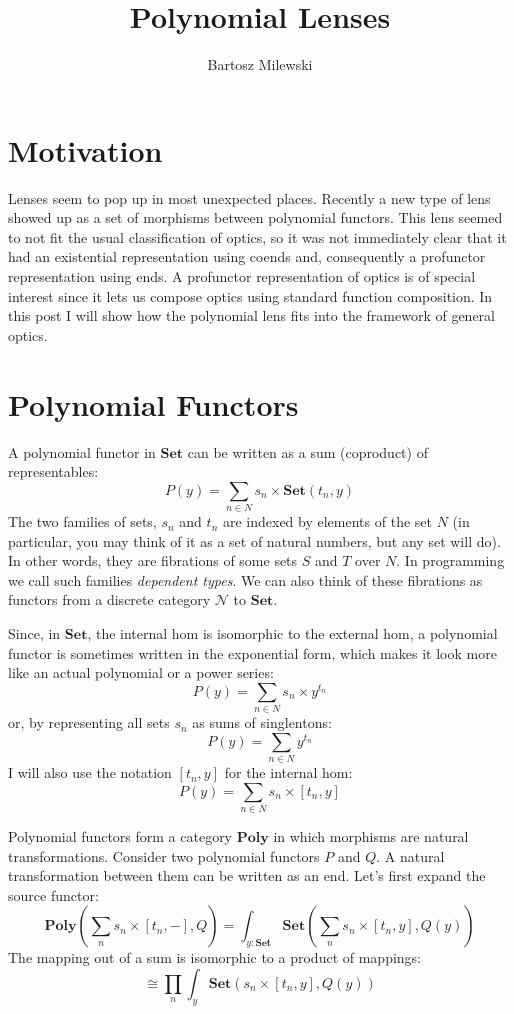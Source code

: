 \documentclass[11pt]{amsart}
\author{Bartosz Milewski}
\title{Polynomial Lenses}
\begin{document}
\maketitle{}

\section{Motivation}
Lenses seem to pop up in most unexpected places. Recently a new type of lens showed up as a set of morphisms between polynomial functors. This lens seemed to not fit the usual classification of optics, so it was not immediately clear that it had an existential representation using coends and, consequently a profunctor representation using ends. A profunctor representation of optics is of special interest since it lets us compose optics using standard function composition. In this post I will show how the polynomial lens fits into the framework of general optics.

\section{Polynomial Functors}

A polynomial functor in $\mathbf{Set}$ can be written as a sum (coproduct) of representables:
\[ P(y) = \sum_{n \in N} s_n \times \mathbf{Set}(t_n, y) \]
The two families of sets, $s_n$ and $t_n$ are indexed by elements of the set $N$ (in particular, you may think of it as a set of natural numbers, but any set will do). In other words, they are fibrations of some sets $S$ and $T$ over $N$. In programming we call such families \emph{dependent types}. We can also think of these fibrations as functors from a discrete category $\mathcal{N}$ to $\mathbf{Set}$. 

Since, in $\mathbf{Set}$, the internal hom is isomorphic to the external hom, a polynomial functor is sometimes written in the exponential form, which makes it look more like an actual polynomial or a power series:
\[ P(y) = \sum_{n \in N} s_n \times y^{t_n} \]
or, by representing all sets $s_n$ as sums of singlentons:
\[ P(y) = \sum_{n \in N} y^{t_n} \]
I will also use the notation $[t_n, y]$ for the internal hom:
\[ P(y) = \sum_{n \in N} s_n \times [t_n, y] \]
  
Polynomial functors form a category $\mathbf{Poly}$ in which morphisms are natural transformations. Consider two polynomial functors $P$ and $Q$. A natural transformation between them can be written as an end. Let's first expand the source functor:
\[   \mathbf{Poly}\left( \sum_n s_n \times [t_n, -], Q\right)  =  \int_{y\colon \mathbf{Set}} \mathbf{Set} \left(\sum_n s_n \times [t_n, y], Q(y)\right)\]
The mapping out of a sum is isomorphic to a product of mappings:
\[ \cong \prod_n \int_y \mathbf{Set} \left(s_n \times [t_n, y], Q(y)\right) \]
\end{document}
